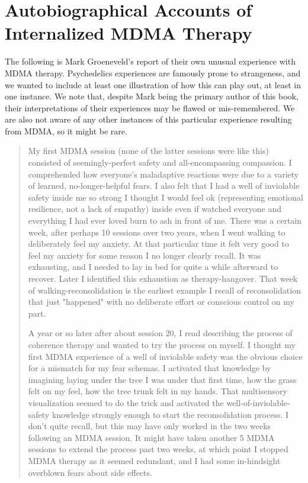 \documentclass[12pt,letterpaper]{book}
\begin{document}
\chapter{Autobiographical Accounts of Internalized MDMA Therapy}
\label{autobiography}
The following is Mark Groeneveld's report of their own unusual experience with MDMA therapy. Psychedelics experiences are famously prone to strangeness, and we wanted to include at least one illustration of how this can play out, at least in one instance. We note that, despite Mark being the primary author of this book, their interpretations of their experiences may be flawed or mis-remembered. We are also not aware of any other instances of this particular experience resulting from MDMA, so it might be rare.
\begin{quotation}
    My first MDMA session (none of the latter sessions were like this) consisted of seemingly-perfect safety and all-encompassing compassion. I comprehended how everyone's maladaptive reactions were due to a variety of learned, no-longer-helpful fears. I also felt that I had a well of inviolable safety inside me so strong I thought I would feel ok (representing emotional resilience, not a lack of empathy) inside even if watched everyone and everything I had ever loved burn to ash in front of me. There was a certain week, after perhaps 10 sessions over two years, when I went walking to deliberately feel my anxiety. At that particular time it felt very good to feel my anxiety for some reason I no longer clearly recall. It was exhausting, and I needed to lay in bed for quite a while afterward to recover. Later I identified this exhaustion as therapy-hangover. That week of walking-reconsolidation is the earliest example I recall of reconsolidation that just "happened" with no deliberate effort or conscious control on my part.
    
    A year or so later after about session 20, I read \cite{lesswrongCoherenceTherapy} describing the process of coherence therapy and wanted to try the process on myself. I thought my first MDMA experience of a well of inviolable safety was the obvious choice for a mismatch for my fear schemas. I activated that knowledge by imagining laying under the tree I was under that first time, how the grass felt on my feel, how the tree trunk felt in my hands. That multisensory visualization seemed to do the trick and activated the well-of-inviolable-safety knowledge strongly enough to start the reconsolidation process. I don't quite recall, but this may have only worked in the two weeks following an MDMA session. It might have taken another 5 MDMA sessions to extend the process past two weeks, at which point I stopped MDMA therapy as it seemed redundant, and I had some in-hindsight overblown fears about side effects.


\end{quotation}
\end{document}
